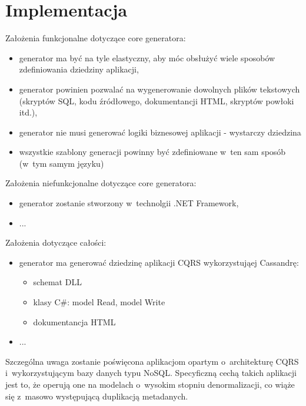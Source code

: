 \chapter{Implementacja} \label{chap:implementation}

Założenia funkcjonalne dotyczące core generatora:

\begin{itemize}
 \item generator ma być na tyle elastyczny, aby móc obsłużyć wiele sposobów zdefiniowania dziedziny aplikacji,
 \item generator powinien pozwalać na wygenerowanie dowolnych plików tekstowych (skryptów SQL, kodu źródłowego, dokumentancji HTML, skryptów powłoki itd.),
 \item generator nie musi generować logiki biznesowej aplikacji - wystarczy dziedzina
 \item wszystkie szablony generacji powinny być zdefiniowane w~ten sam sposób (w~tym samym języku)
\end{itemize}

Założenia niefunkcjonalne dotyczące core generatora:

\begin{itemize}
 \item generator zostanie stworzony w~technolgii .NET Framework,
 \item ...
\end{itemize}

Założenia dotyczące całości:

\begin{itemize}
 \item generator ma generować dziedzinę aplikacji CQRS wykorzystująej Cassandrę:
  \begin{itemize}
   \item schemat DLL
   \item klasy C\#: model Read, model Write
   \item dokumentancja HTML
  \end{itemize}
 \item ...
\end{itemize}

Szczególna uwaga zostanie poświęcona aplikacjom opartym o~architekturę CQRS i~wykorzystującym bazy danych typu NoSQL.
Specyficzną cechą takich aplikacji jest to, że operują one na modelach o~wysokim stopniu denormalizacji, co wiąże się z~masowo występującą duplikacją metadanych.
